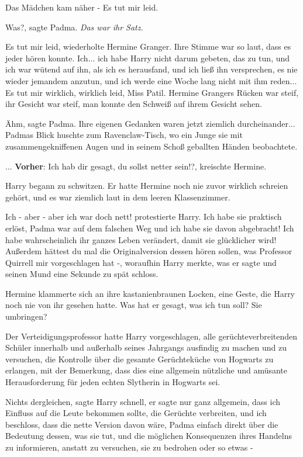 Das Mädchen kam näher - \glqq{}Es tut mir leid.\grqq{}

\glqq{}Was?\grqq{}, sagte Padma. \emph{Das war ihr Satz.}

\glqq{}Es tut mir leid\grqq{}, wiederholte Hermine Granger. Ihre Stimme war so
laut, dass es jeder hören konnte. \glqq{}Ich... ich habe Harry nicht darum
gebeten, das zu tun, und ich war wütend auf ihn, als ich es herausfand, und ich
ließ ihn versprechen, es nie wieder jemandem anzutun, und ich werde eine Woche
lang nicht mit ihm reden... Es tut mir wirklich, wirklich leid, Miss Patil.\grqq{}
Hermine Grangers Rücken war steif, ihr Gesicht war steif, man konnte den Schweiß
auf ihrem Gesicht sehen.

\glqq{}Ähm\grqq{}, sagte Padma. Ihre eigenen Gedanken waren jetzt ziemlich
durcheinander... Padmas Blick huschte zum Ravenclaw-Tisch, wo ein Junge sie mit
zusammengekniffenen Augen und in seinem Schoß geballten Händen beobachtete.

... \textbf{Vorher}: \glqq{}Ich hab dir gesagt, du sollst netter sein!?\grqq{},
kreischte Hermine.

Harry begann zu schwitzen. Er hatte Hermine noch nie zuvor wirklich schreien
gehört, und es war ziemlich laut in dem leeren Klassenzimmer.

\glqq{}Ich - aber - aber ich war doch nett!\grqq{} protestierte Harry. \glqq{}Ich
habe sie praktisch erlöst, Padma war auf dem falschen Weg und ich habe sie davon
abgebracht! Ich habe wahrscheinlich ihr ganzes Leben verändert, damit sie
glücklicher wird! Außerdem hättest du mal die Originalversion dessen hören
sollen, was Professor Quirrell mir vorgeschlagen hat -\grqq{}, woraufhin Harry
merkte, was er sagte und seinen Mund eine Sekunde zu spät schloss.

Hermine klammerte sich an ihre kastanienbraunen Locken, eine Geste, die Harry
noch nie von ihr gesehen hatte. \glqq{}Was hat er gesagt, was ich tun soll? Sie
umbringen?\grqq{}

Der Verteidigungsprofessor hatte Harry vorgeschlagen, alle gerüchteverbreitenden
Schüler innerhalb und außerhalb seines Jahrgangs ausfindig zu machen und zu
versuchen, die Kontrolle über die gesamte Gerüchteküche von Hogwarts zu
erlangen, mit der Bemerkung, dass dies eine allgemein nützliche und amüsante
Herausforderung für jeden echten Slytherin in Hogwarts sei.

\glqq{}Nichts dergleichen\grqq{}, sagte Harry schnell, \glqq{}er sagte nur ganz
allgemein, dass ich Einfluss auf die Leute bekommen sollte, die Gerüchte
verbreiten, und ich beschloss, dass die nette Version davon wäre, Padma einfach
direkt über die Bedeutung dessen, was sie tut, und die möglichen Konsequenzen
ihres Handelns zu informieren, anstatt zu versuchen, sie zu bedrohen oder so
etwas -\grqq{}

